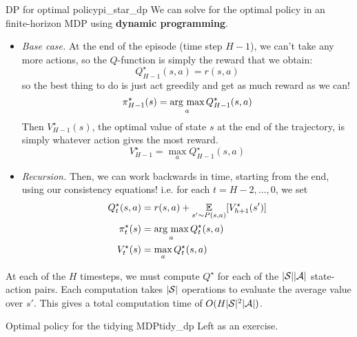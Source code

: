 \documentclass[../main/main]{subfiles}
\begin{document}
\begin{definition}{DP for optimal policy}{pi_star_dp}
    We can solve for the optimal policy in an finite-horizon MDP using \textbf{dynamic programming}.
    
    \begin{itemize}
    \item \emph{Base case.} At the end of the episode (time step $H-1$),
        we can't take any more actions, so the $Q$-function is simply the reward
        that we obtain:
        \[
            Q^\star_{H-1}(s, a) = r(s, a)
        \]
        so the best thing to do is just act greedily
        and get as much reward as we can!
        \[
            \pi^\star_{H-1}(s) = \argmax_a Q^\star_{H-1}(s, a)
        \]
        Then $V^\star_{H-1}(s)$, the optimal value of state $s$ at the end of the
        trajectory, is simply whatever action gives the most reward.
        \[
            V^\star_{H-1} = \max_a Q^\star_{H-1}(s, a)
        \]
    
    \item \emph{Recursion.} Then, we can work backwards in time, starting from the
        end, using our consistency equations! i.e. for each $t = H-2, \dots, 0$, we set
        \begin{align*}
            Q^\star_{t}(s, a) &= r(s, a) + \E_{s' \sim P(s, a)} [V^\star_{h+1}(s')] \\
            \pi^\star_{t}(s) &= \argmax_a Q^\star_{t}(s, a) \\
            V^\star_{t}(s) &= \max_a Q^\star_{t}(s, a)
        \end{align*}
    \end{itemize}
    
    
    
    
    At each of the $H$ timesteps, we must compute $Q^{\star}$ for each of the $|\S| |\A|$ state-action pairs. Each computation takes $|\S|$ operations to evaluate the average value over $s'$. This gives a total computation time of $O(H |\S|^2 |\A|)$.
\end{definition}


\begin{example}{Optimal policy for the tidying MDP}{tidy_dp}
    Left as an exercise.
\end{example}
\end{document}
